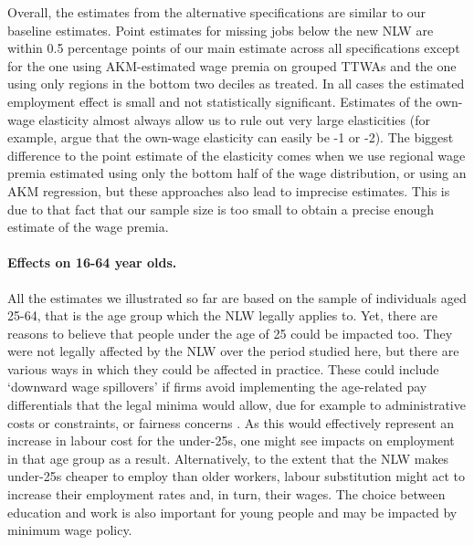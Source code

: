 Overall, the estimates from the alternative specifications are similar to our baseline estimates. Point estimates for missing jobs below the new NLW are within 0.5 percentage points of our main estimate across all specifications except for the one using AKM-estimated wage premia on grouped TTWAs and the one using only regions in the bottom two deciles as treated. In all cases the estimated employment effect is small and not statistically significant. Estimates of the own-wage elasticity almost always allow us to rule out very large elasticities (for example, \cite{NeumarkWascher2008} argue that the own-wage elasticity can easily be -1 or -2). The biggest difference to the point estimate of the elasticity comes when we use regional wage premia estimated using only the bottom half of the wage distribution, or using an AKM regression, but these approaches also lead to imprecise estimates. This is due to that fact that our sample size is too small to obtain a precise enough estimate of the wage premia.


\paragraph{Effects on 16-64 year olds.} All the estimates we illustrated so far are based on the sample of individuals aged 25-64, that is the age group which the NLW legally applies to. Yet, there are reasons to believe that people under the age of 25 could be impacted too. They were not legally affected by the NLW over the period studied here, but there are various ways in which they could be affected in practice. These could include `downward wage spillovers' if firms avoid implementing the age-related pay differentials that the legal minima would allow, due for example to administrative costs or constraints, or fairness concerns \citep{GiupponiMachin2022}. As this would effectively represent an increase in labour cost for the under-25s, one might see impacts on employment in that age group as a result. Alternatively, to the extent that the NLW makes under-25s cheaper to employ than older workers, labour substitution might act to increase their employment rates and, in turn, their wages. The choice between education and work is also important for young people and may be impacted by minimum wage policy. 

